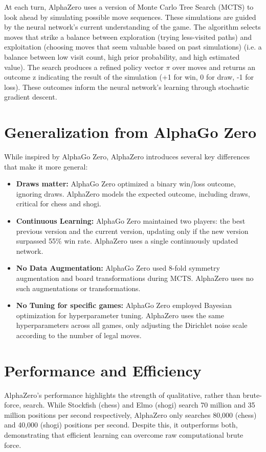 \documentclass[12pt]{article}
\begin{document}
\noindent At each turn, AlphaZero uses a version of Monte Carlo Tree Search (MCTS) to look ahead by simulating possible move sequences. These simulations are guided by the neural network’s current understanding of the game. The algorithm selects moves that strike a balance between exploration (trying less-visited paths) and exploitation (choosing moves that seem valuable based on past simulations) (i.e. a balance between low visit count, high prior probability, and high estimated
value). The search produces a refined policy vector $\pi$ over moves and returns an outcome z
indicating the result of the simulation (+1 for win, 0 for draw, -1 for loss). These outcomes
inform the neural network’s learning through stochastic gradient descent.


\section*{Generalization from AlphaGo Zero}

While inspired by AlphaGo Zero, AlphaZero introduces several key differences that make it more general:

\begin{itemize}
    \item \textbf{Draws matter:} AlphaGo Zero optimized a binary win/loss outcome, ignoring draws. AlphaZero models the expected outcome, including draws, critical for chess and shogi.
    \item \textbf{Continuous Learning:} AlphaGo Zero maintained two players: the best previous version and the current version, updating only if the new version surpassed 55\% win rate. AlphaZero uses a single continuously updated network.
    \item \textbf{No Data Augmentation:} AlphaGo Zero used 8-fold symmetry augmentation and board transformations during MCTS. AlphaZero uses no such augmentations or transformations.
    \item \textbf{No Tuning for specific games:} AlphaGo Zero employed Bayesian optimization for hyperparameter tuning. AlphaZero uses the same hyperparameters across all games, only adjusting the Dirichlet noise scale according to the number of legal moves.
\end{itemize}

\section*{Performance and Efficiency}

AlphaZero’s performance highlights the strength of qualitative, rather than brute-force, search. While Stockfish (chess) and Elmo (shogi) search 70 million and 35 million positions per second respectively, AlphaZero only searches 80,000 (chess) and 40,000 (shogi) positions per second. Despite this, it outperforms both, demonstrating that efficient learning can overcome raw computational brute force. \\
\end{document}
